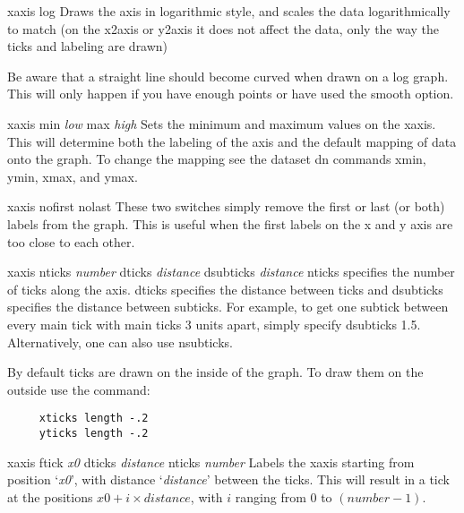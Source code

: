 \begin{commanddescription}
\item[{\sf xaxis log}  ]
Draws the axis in logarithmic style, and scales the data logarithmically
to match (on the x2axis or y2axis it does not affect the data, only the
way the ticks and labeling are drawn)

Be aware that a straight line should become curved
when drawn on a log graph.  This will only happen if you have
enough points or have used the {\sf smooth} option.

\item[{\sf xaxis min {\it low} max {\it high}} ]
Sets the minimum and maximum values on the xaxis.  This will determine both the
labeling of the axis and the default mapping of data onto the graph.
To change the mapping see the dataset {\sf dn} commands
{\sf xmin}, {\sf ymin}, {\sf xmax}, and {\sf ymax}.

\item[{\sf xaxis nofirst nolast}  ]
These two switches simply remove the first or last (or both) labels from
the graph.  This is useful when the first labels on
the x and y axis are too close to each other.

\item[{\sf xaxis nticks {\it number} dticks {\it distance} dsubticks {\it distance}} ]
{\sf nticks} specifies the number of ticks along the axis.  {\sf dticks}
specifies the distance between ticks and {\sf dsubticks}
specifies the distance between subticks.  For example, to get one subtick
between every main tick with main ticks 3 units apart, simply specify
{\sf dsubticks 1.5}. Alternatively, one can also use {\sf nsubticks}.

By default ticks are drawn on the inside of the graph.  To draw
them on the outside use the command:

\preglecode{}
\begin{Verbatim}
     xticks length -.2
     yticks length -.2
\end{Verbatim}
\postglecode{}

\item[{\sf xaxis ftick {\it x0} dticks {\it distance} nticks {\it number}}]
Labels the xaxis starting from position `{\it x0}', with distance `{\it distance}' between the ticks. This will result in a tick at the positions $\mathit{x0} + i \times \mathit{distance}$, with $i$ ranging from 0 to $(\mathit{number}-1)$.


\end{commanddescription}
